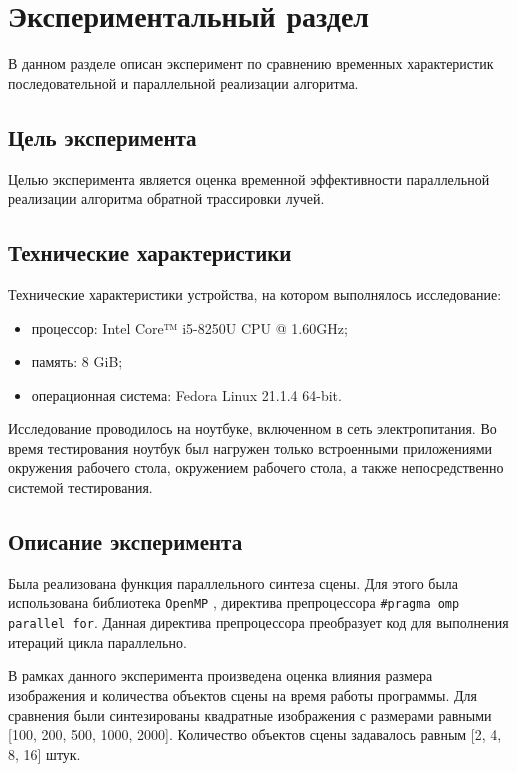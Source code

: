 \chapter{Экспериментальный раздел}

    В данном разделе описан эксперимент по сравнению временных характеристик последовательной и параллельной реализации алгоритма.
    
    \section{Цель эксперимента}
    
        Целью эксперимента является оценка временной эффективности параллельной реализации алгоритма обратной трассировки лучей.
    
    \section{Технические характеристики}

        Технические характеристики устройства, на котором выполнялось исследование:

        \begin{itemize}
        	\item процессор: Intel Core™ i5-8250U \cite{i5} CPU @ 1.60GHz;
        	\item память: 8 GiB;
        	\item операционная система: Fedora \cite{fedora} Linux \cite{linux} 21.1.4 64-bit.
        \end{itemize}
        
        Исследование проводилось на ноутбуке, включенном в сеть электропитания. Во время тестирования ноутбук был нагружен только встроенными приложениями окружения рабочего стола, окружением рабочего стола, а также непосредственно системой тестирования.
        
    \section{Описание эксперимента}

        Была реализована функция параллельного синтеза сцены. Для этого была использована библиотека \texttt{OpenMP} \cite{omp}, директива препроцессора \texttt{\#pragma omp parallel for}. Данная директива препроцессора преобразует код для выполнения итераций цикла параллельно. 

        В рамках данного эксперимента произведена оценка влияния размера изображения и количества объектов сцены на время работы программы. Для сравнения были синтезированы квадратные изображения с размерами равными [100, 200, 500, 1000, 2000]. Количество объектов сцены задавалось равным [2, 4, 8, 16] штук.
 
